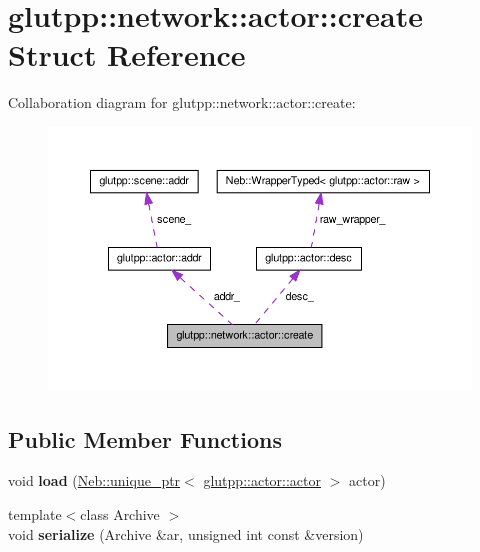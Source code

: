 \hypertarget{structglutpp_1_1network_1_1actor_1_1create}{\section{glutpp\-:\-:network\-:\-:actor\-:\-:create \-Struct \-Reference}
\label{structglutpp_1_1network_1_1actor_1_1create}
}


\-Collaboration diagram for glutpp\-:\-:network\-:\-:actor\-:\-:create\-:
\nopagebreak
\begin{figure}[H]
\begin{center}
\leavevmode
\includegraphics[width=350pt]{structglutpp_1_1network_1_1actor_1_1create__coll__graph}
\end{center}
\end{figure}
\subsection*{\-Public \-Member \-Functions}
\begin{DoxyCompactItemize}
\item 
\hypertarget{structglutpp_1_1network_1_1actor_1_1create_accc621699dd1fd80af572dda0caf64cf}{void {\bfseries load} (\hyperlink{classNeb_1_1unique__ptr}{\-Neb\-::unique\-\_\-ptr}$<$ \hyperlink{classglutpp_1_1actor_1_1actor}{glutpp\-::actor\-::actor} $>$ actor)}\label{structglutpp_1_1network_1_1actor_1_1create_accc621699dd1fd80af572dda0caf64cf}

\item 
\hypertarget{structglutpp_1_1network_1_1actor_1_1create_aad9dd37d1bfd140b16db4576e2e0cf95}{{\footnotesize template$<$class Archive $>$ }\\void {\bfseries serialize} (\-Archive \&ar, unsigned int const \&version)}\label{structglutpp_1_1network_1_1actor_1_1create_aad9dd37d1bfd140b16db4576e2e0cf95}

\end{DoxyCompactItemize}
